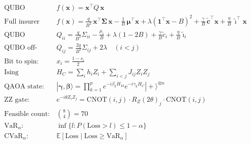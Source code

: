 \documentclass[12pt, a4paper]{article}
\begin{document}
\begin{align}
\text{QUBO objective:} \quad & f(\mathbf{x}) = \mathbf{x}^\top Q\, \mathbf{x} \\[8pt]
\text{Full insurer objective:} \quad & f(\mathbf{x}) = \frac{q}{B^2}\, \mathbf{x}^\top \bm{\Sigma}\, \mathbf{x}
    - \frac{1}{B}\, \bm{\mu}^\top \mathbf{x}
    + \lambda (\mathbf{1}^\top \mathbf{x} - B)^2
    + \frac{\gamma}{B}\, \tilde{\mathbf{c}}^\top \mathbf{x}
    + \frac{\eta}{B}\, \tilde{\bm{\imath}}^\top \mathbf{x} \\[8pt]
\text{QUBO diagonal:} \quad & Q_{ii} = \frac{q}{B^2}\Sigma_{ii} - \frac{\mu_i}{B} + \lambda(1-2B) + \frac{\gamma}{B}\tilde{c}_i + \frac{\eta}{B}\tilde{\imath}_i \\[8pt]
\text{QUBO off-diag:} \quad & Q_{ij} = \frac{2q}{B^2}\Sigma_{ij} + 2\lambda \quad (i < j) \\[8pt]
\text{Bit to spin:} \quad & x_i = \frac{1 - s_i}{2} \\[8pt]
\text{Ising Hamiltonian:} \quad & H_C = \sum_i h_i Z_i + \sum_{i<j} J_{ij} Z_i Z_j \\[8pt]
\text{QAOA state:} \quad & |\bm{\gamma},\bm{\beta}\rangle = \prod_{k=1}^p e^{-i\beta_k H_M} e^{-i\gamma_k H_C} |+\rangle^{\otimes n} \\[8pt]
\text{ZZ gate:} \quad & e^{-i\theta Z_i Z_j} = \text{CNOT}(i,j) \cdot R_Z(2\theta)_j \cdot \text{CNOT}(i,j) \\[8pt]
\text{Feasible count:} \quad & \binom{8}{4} = 70 \\[8pt]
\text{VaR}_\alpha: \quad & \inf\{l : P(\text{Loss} > l) \leq 1 - \alpha\} \\[8pt]
\text{CVaR}_\alpha: \quad & \mathbb{E}[\text{Loss} \mid \text{Loss} \geq \text{VaR}_\alpha]
\end{align}
\end{document}
